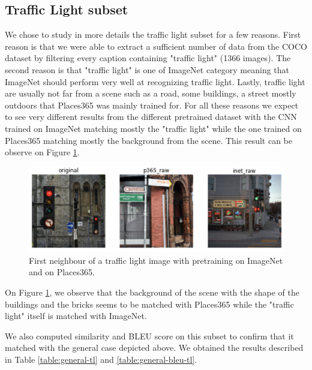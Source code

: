 \documentclass[a4paper]{article}
\begin{document}
	\subsection{Traffic Light subset}
	
We chose to study in more details the traffic light subset for a few reasons. First reason is that we were able to extract a sufficient number of data from the COCO dataset by filtering every caption containing "traffic light" (1366 images). The second reason is that "traffic light" is one of ImageNet category meaning that ImageNet should perform very well at recognizing traffic light. Lastly, traffic light are usually not far from a scene such as a road, some buildings, a street mostly outdoors that Places365 was mainly trained for. For all these reasons we expect to see very different results from the different pretrained dataset with the CNN trained on ImageNet matching mostly the "traffic light" while the one trained on Places365 matching mostly the background from the scene. This result can be observe on Figure \ref{fig:visual-subgroup}.

\begin{figure}[h]
	\includegraphics[width=\textwidth]{visual-subgroup}
	\caption{First neighbour of a traffic light image with pretraining on ImageNet and on Places365.}
	\label{fig:visual-subgroup}
\end{figure}

On Figure \ref{fig:visual-subgroup}, we observe that the background of the scene with the shape of the buildings and the bricks seems to be matched with Places365 while the "traffic light" itself is matched with ImageNet.


We also computed similarity and BLEU score on this subset to confirm that it matched with the general case depicted above. We obtained the results described in Table \ref{table:general-tl} and \ref{table:general-bleu-tl}.
\end{document}
